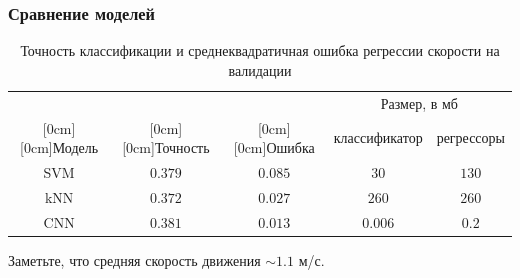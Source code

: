 \documentclass{beamer}
\begin{document}

\begin{frame}
\frametitle{Сравнение моделей} %

\begin{table}[H]
    \caption{Точность классификации и среднеквадратичная ошибка регрессии скорости на валидации}
    \begin{center}
        \begin{tabular}{|c|c|c|c|c|}
            \hline
            & & & \multicolumn{2}{c|}{Размер, в мб} \\
            \cline{4-5}
            \raisebox{1.5ex}[0cm][0cm]{Модель}
            & \raisebox{1.5ex}[0cm][0cm]{Точность}
            & \raisebox{1.5ex}[0cm][0cm]{Ошибка} 
            & классификатор
            & регрессоры
            \\
            \hline
            SVM
            & $0.379$ 
            & $0.085$ 
            & $30$
            & $130$
            \\
            \hline
            kNN
            & $0.372$
            & $0.027$
            & $260$
            & $260$
            \\
            \hline
            CNN
            & $0.381$
            & $0.013$
            & $0.006$
            & $0.2$
            \\
            \hline
            
        \end{tabular}
    \end{center}
\end{table}
Заметьте, что средняя скорость движения $\sim 1.1$ м/с.
\end{frame}
\end{document}

